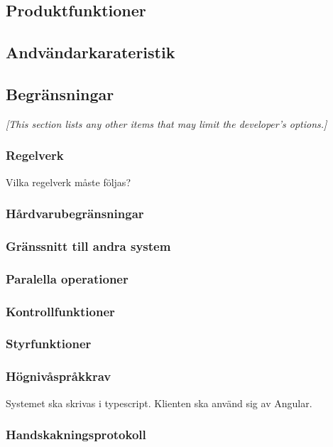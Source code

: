 \documentclass{article}
\begin{document}
\begin{enumerate}
\subsection{Produktfunktioner}
\label{subsec:Produktfunktioner}
\subsection{Andvändarkarateristik}
\label{subsec:Andvandarkarateristik}

\subsection{Begränsningar}
\label{subsec:Begransningar}
\emph{[This section lists any other items that may limit the developer's
  options.]}


\subsubsection{Regelverk}
\label{subsec:Regelverk}
Vilka regelverk måste följas?
\subsubsection{Hårdvarubegränsningar}
\label{subsec:Hardvarubegransningar}
\subsubsection{Gränssnitt till andra system}
\label{subsec:Granssnitt till andra system}
\subsubsection{Paralella operationer}
\label{subsec:Paralella operationer}
\subsubsection{Kontrollfunktioner}
\label{subsec:Kontrollfunktioner}
\subsubsection{Styrfunktioner}
\label{subsec:Styrfunktioner}
\subsubsection{Högnivåspråkkrav}
\label{subsec:Hognivasprakkrav}
Systemet ska skrivas i typescript. Klienten ska använd sig av Angular.
\subsubsection{Handskakningsprotokoll}
\label{subsec:Handskakningsprotokoll}

\end{enumerate}
\end{document}
